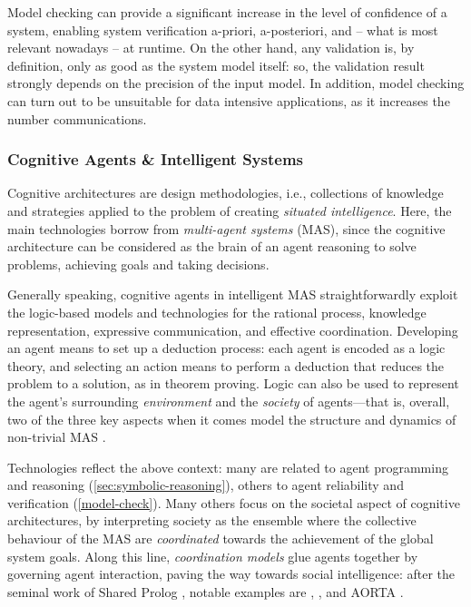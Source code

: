 \documentclass[12pt,a4paper,openright,twoside]{book}
\begin{document}
Model checking can provide a significant increase in the level of confidence of a system, enabling system verification a-priori, a-posteriori, and -- what is most relevant nowadays -- at runtime.
%
On the other hand, any validation is, by definition, only as good as the system model itself: so, the validation result strongly depends on the precision of the input model.
%
In addition, model checking can turn out to be unsuitable for data intensive applications, as it increases the number communications.

\subsubsection{Cognitive Agents \& Intelligent Systems}\label{ssec:cognitive-arch}

Cognitive architectures are design methodologies, i.e., collections of knowledge and strategies applied to the problem of creating \emph{situated intelligence}.
%
Here, the main technologies borrow from \emph{multi-agent systems} (MAS), since the cognitive architecture can be considered as the brain of an agent reasoning to solve problems, achieving goals and taking decisions.

Generally speaking, cognitive agents in intelligent MAS straightforwardly exploit the logic-based models and technologies for the rational process, knowledge representation, expressive communication, and effective coordination.
%
Developing an agent means to set up a deduction process: each agent is encoded as a logic theory, and selecting an action means to perform a deduction that reduces the problem to a solution, as in theorem proving.
%
Logic can also be used to represent the agent's surrounding \emph{environment} and the \emph{society} of agents---that is, overall, two of the three key aspects when it comes model the structure and dynamics of non-trivial MAS \cite{soda-aoseI}.

Technologies reflect the above context: many are related to agent programming and reasoning (\cref{sec:symbolic-reasoning}), others to agent reliability and verification (\cref{model-check}).
%
Many others focus on the societal aspect of cognitive architectures, by interpreting society as the ensemble where the collective behaviour of the MAS are \emph{coordinated} towards the achievement of the global system goals.
%
Along this line, \emph{coordination models} glue agents together by governing agent interaction, paving the way towards social intelligence: after the seminal work of Shared Prolog \cite{logictuplespaces-ngc12}, notable examples are \tucson{} \cite{tucson-jaamas2}, \respect{} \cite{respect-scp41}, and AORTA \cite{jensen2014-aorta-emas}.
\end{document}
